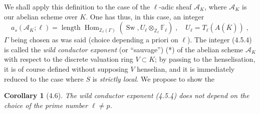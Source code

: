 \documentclass[11pt]{article}
\theoremstyle{plain}
\newtheorem{corollaire}[theorem]{Corollary}
\theoremstyle{definition}
\theoremstyle{remark}
\newcommand{\FF}{\mathbb F}
\newcommand{\ZZ}{\mathbb Z}
\newcommand{\sA}{\mathscr A}\newcommand{\sB}{\mathscr B}\newcommand{\sC}{\mathscr C}
\DeclareMathOperator{\Hom}{Hom}
\newcommand{\Tl}{T_\ell}
\newcommand{\longueur}{\operatorname{length}}
\begin{document}
We shall apply this definition to the case of the $\ell$-adic sheaf
$\sA_K$, where $\sA_K$ is our abelian scheme over $K$. One has thus, in
this case, an integer
\begin{equation}
a_s(\sA_K; \ell) = \longueur
\Hom_{\ZZ_{\ell}(\Gamma)}(\operatorname{Sw}, U_{\ell} \otimes_{\ZZ_{\ell}}
\FF_{\ell}) \; , \quad U_{\ell} = \Tl(A(\overline{K})) \; ,
\end{equation}
$\Gamma$ being chosen as was said (choice depending a priori on $\ell$).
The integer (4.5.4) is called the \emph{wild conductor exponent} (or
``sauvage'') (*) of the abelian scheme $\sA_K$ with respect to the
discrete valuation ring $V \subset K$; by passing to the henselisation, it
is of course defined without supposing $V$ henselian, and it is
immediately reduced to the case where $S$ is \emph{strictly local}. We
propose to show the

\begin{corollaire}[4.6]
The wild conductor exponent (4.5.4) does not depend on the choice of
the prime number $\ell \neq p$.
\end{corollaire}
\end{document}
